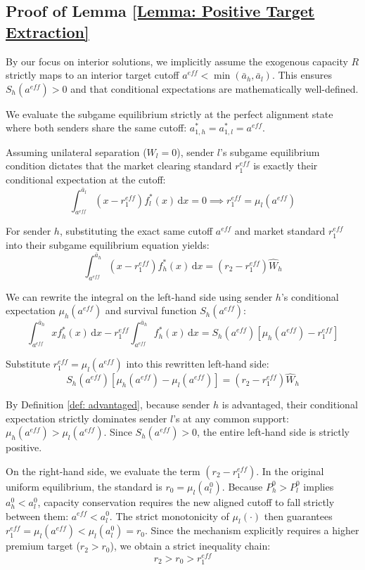 \documentclass[12pt, a4paper]{article}
\begin{document}
\subsection*{Proof of Lemma \ref{Lemma: Positive Target Extraction}}

By our focus on interior solutions, we implicitly assume the exogenous capacity $R$ strictly maps to an interior target cutoff $a^{eff} < \min(\bar{a}_h, \bar{a}_l)$. This ensures $S_h(a^{eff}) > 0$ and that conditional expectations are mathematically well-defined.

We evaluate the subgame equilibrium strictly at the perfect alignment state where both senders share the same cutoff: $a_{1,h}^* = a_{1,l}^* = a^{eff}$. 

Assuming unilateral separation ($W_l = 0$), sender $l$'s subgame equilibrium condition dictates that the market clearing standard $r_1^{eff}$ is exactly their conditional expectation at the cutoff:
$$ \int_{a^{eff}}^{\bar{a}_l} (x - r_1^{eff}) f_l^*(x) \, \mathrm{d}x = 0 \implies r_1^{eff} = \mu_l(a^{eff}) $$

For sender $h$, substituting the exact same cutoff $a^{eff}$ and market standard $r_1^{eff}$ into their subgame equilibrium equation yields:
$$ \int_{a^{eff}}^{\bar{a}_h} (x - r_1^{eff}) f_h^*(x) \, \mathrm{d}x = (r_2 - r_1^{eff}) \hat{W}_h $$

We can rewrite the integral on the left-hand side using sender $h$'s conditional expectation $\mu_h(a^{eff})$ and survival function $S_h(a^{eff})$:
$$ \int_{a^{eff}}^{\bar{a}_h} x f_h^*(x) \, \mathrm{d}x - r_1^{eff} \int_{a^{eff}}^{\bar{a}_h} f_h^*(x) \, \mathrm{d}x = S_h(a^{eff}) [ \mu_h(a^{eff}) - r_1^{eff} ] $$

Substitute $r_1^{eff} = \mu_l(a^{eff})$ into this rewritten left-hand side:
$$ S_h(a^{eff}) [ \mu_h(a^{eff}) - \mu_l(a^{eff}) ] = (r_2 - r_1^{eff}) \hat{W}_h $$

By Definition \ref{def: advantaged}, because sender $h$ is advantaged, their conditional expectation strictly dominates sender $l$'s at any common support: $\mu_h(a^{eff}) > \mu_l(a^{eff})$. Since $S_h(a^{eff}) > 0$, the entire left-hand side is strictly positive.

On the right-hand side, we evaluate the term $(r_2 - r_1^{eff})$. In the original uniform equilibrium, the standard is $r_0 = \mu_l(a_l^0)$. Because $P_h^0 > P_l^0$ implies $a_h^0 < a_l^0$, capacity conservation requires the new aligned cutoff to fall strictly between them: $a^{eff} < a_l^0$. The strict monotonicity of $\mu_l(\cdot)$ then guarantees $r_1^{eff} = \mu_l(a^{eff}) < \mu_l(a_l^0) = r_0$. Since the mechanism explicitly requires a higher premium target ($r_2 > r_0$), we obtain a strict inequality chain: 
$$ r_2 > r_0 > r_1^{eff} $$
\end{document}
